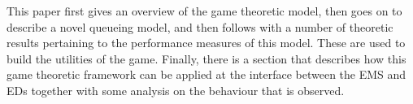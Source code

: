 This paper first gives an overview of the game theoretic model, then goes on 
to describe a novel queueing model, and then follows with a number of theoretic 
results pertaining to the performance measures of this model. 
These are used to build the utilities of the game.
Finally, there is a section that describes how this game theoretic framework
can be applied at the interface between the EMS and EDs together with some 
analysis on the behaviour that is observed.
